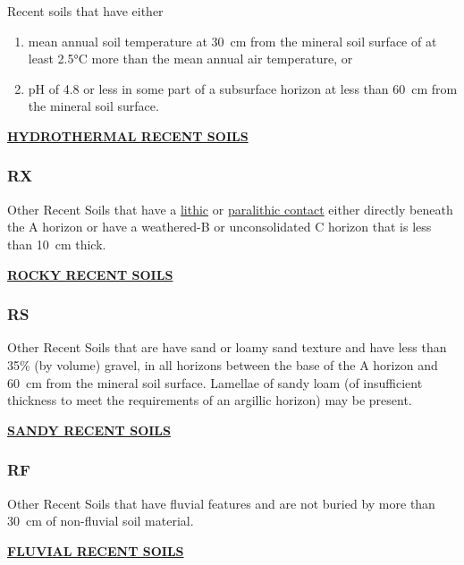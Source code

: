 \documentclass[
  letterpaper,
  DIV=11,
  numbers=noendperiod]{scrreprt}
\providecommand{\tightlist}{%
  \setlength{\itemsep}{0pt}\setlength{\parskip}{0pt}}\usepackage{longtable,booktabs,array}
\begin{document}
Recent soils that have either

\begin{enumerate}
\def\labelenumi{\arabic{enumi}.}
\tightlist
\item
  mean annual soil temperature at 30~cm from the mineral soil surface of
  at least 2.5°C more than the mean annual air temperature, or
\item
  pH of 4.8 or less in some part of a subsurface horizon at less than
  60~cm from the mineral soil surface.
\end{enumerate}

\protect\hyperlink{sec-RH}{\textbf{HYDROTHERMAL RECENT SOILS}}

\hypertarget{sec-key-RX}{%
\subsubsection{\texorpdfstring{\textbf{RX}}{RX}}\label{sec-key-RX}}

Other Recent Soils that have a
\protect\hyperlink{sec-diag-lithc}{lithic} or
\protect\hyperlink{sec-diag-plith}{paralithic contact} either directly
beneath the A horizon or have a weathered-B or unconsolidated C horizon
that is less than 10~cm thick.

\protect\hyperlink{sec-RX}{\textbf{ROCKY RECENT SOILS}}

\hypertarget{sec-key-RS}{%
\subsubsection{\texorpdfstring{\textbf{RS}}{RS}}\label{sec-key-RS}}

Other Recent Soils that are have sand or loamy sand texture and have
less than 35\% (by volume) gravel, in all horizons between the base of
the A horizon and 60~cm from the mineral soil surface. Lamellae of sandy
loam (of insufficient thickness to meet the requirements of an argillic
horizon) may be present.

\protect\hyperlink{sec-RS}{\textbf{SANDY RECENT SOILS}}

\hypertarget{sec-key-RF}{%
\subsubsection{\texorpdfstring{\textbf{RF}}{RF}}\label{sec-key-RF}}

Other Recent Soils that have fluvial features and are not buried by more
than 30~cm of non-fluvial soil material.

\protect\hyperlink{sec-RF}{\textbf{FLUVIAL RECENT SOILS}}
\end{document}
